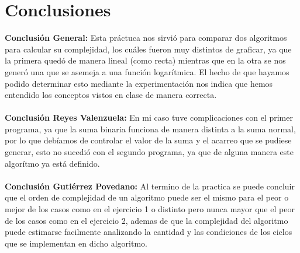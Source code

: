 \documentclass[12pt,twoside]{article}
\begin{document}
\section{Conclusiones}
{\bf Conclusi\'on General:} Esta pr\'actuca nos sirvi\'o para comparar dos algoritmos para calcular su complejidad, los cu\'ales fueron muy distintos de graficar, ya que la primera qued\'o de manera lineal (como recta) mientras que en la otra se nos gener\'o una que se asemeja a una funci\'on logar\'itmica. El hecho de que hayamos podido determinar esto mediante la experimentaci\'on nos indica que hemos entendido los conceptos vistos en clase de manera correcta.\\\\
{\bf Conclusi\'on Reyes Valenzuela:} En mi caso tuve complicaciones con el primer programa, ya que la suma binaria funciona de manera distinta a la suma normal, por lo que deb\'iamos de controlar el valor de la suma y el acarreo que se pudiese generar, esto no sucedi\'o con el segundo programa, ya que de alguna manera este algor\'itmo ya est\'a definido.\\\\
{\bf Conclusi\'on Guti\'errez Povedano:} Al termino de la practica se puede concluir que el orden de complejidad de un algoritmo puede ser el mismo para el peor o mejor de los casos como en el ejercicio 1 o distinto pero nunca mayor que el peor de los casos como en el ejercicio 2, ademas de que la complejidad del algoritmo puede estimarse facilmente analizando la cantidad y las condiciones de los ciclos que se implementan en dicho algoritmo.\\\\
\end{document}
